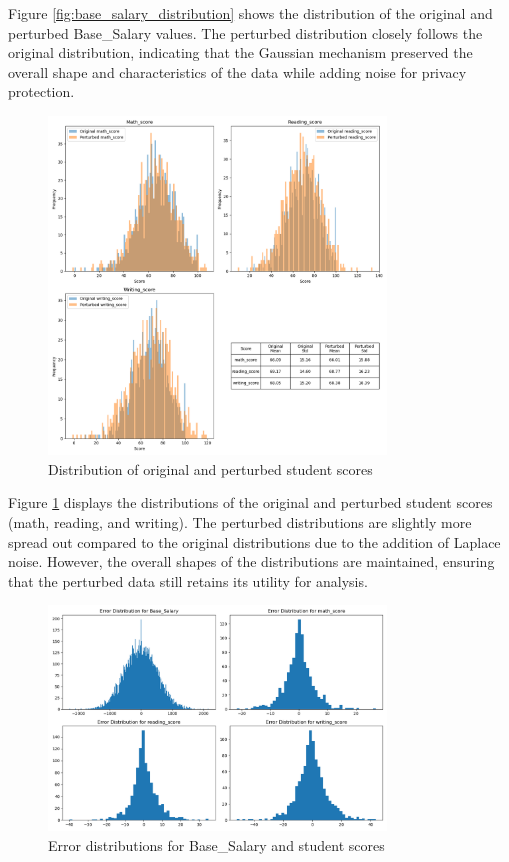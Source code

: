 Figure \ref{fig:base_salary_distribution} shows the distribution of the original and perturbed Base\_Salary values. The perturbed distribution closely follows the original distribution, indicating that the Gaussian mechanism preserved the overall shape and characteristics of the data while adding noise for privacy protection.

\begin{figure}[H]
\centering
\includegraphics[width=0.8\textwidth]{report/media/scores.png}
\caption{Distribution of original and perturbed student scores}
\label{fig:student_scores_distribution}
\end{figure}

Figure \ref{fig:student_scores_distribution} displays the distributions of the original and perturbed student scores (math, reading, and writing). The perturbed distributions are slightly more spread out compared to the original distributions due to the addition of Laplace noise. However, the overall shapes of the distributions are maintained, ensuring that the perturbed data still retains its utility for analysis.
\begin{figure}[H]
\centering
\includegraphics[width=0.8\textwidth]{report/media/distribution.png}
\caption{Error distributions for Base\_Salary and student scores}
\label{fig:error-distributions}
\end{figure}

